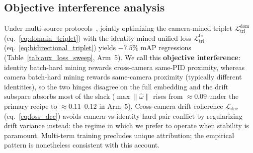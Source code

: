 \subsection{Objective interference analysis} \label{subsec:interference_analysis}
Under multi-source protocols~\cite{cho2024generalizable,zhao2021m3l}, jointly optimizing the camera-mined triplet $\mathcal{L}_{\mathrm{tri}}^{\mathrm{dom}}$ (eq.~\ref{eq:domain_triplet}) with the identity-mined unified loss $\mathcal{L}_{\mathrm{tri}}^{\mathrm{bi}}$ (eq.~\ref{eq:bidirectional_triplet}) yields $-7.5\%$ mAP regressions (Table~\ref{tab:aux_loss_sweep}, Arm~5). We call this \textbf{objective interference}: identity batch-hard mining rewards cross-camera same-PID proximity, whereas camera batch-hard mining rewards same-camera proximity (typically different identities), so the two hinges disagree on the full embedding and the drift subspace absorbs most of the slack ($\max\|\hat{\omega}\|$ rises from ${\approx}0.09$ under the primary recipe to ${\approx}0.11$--$0.12$ in Arm~5). Cross-camera drift coherence $\mathcal{L}_{\mathrm{dcc}}$ (eq.~\ref{eq:loss_dcc}) avoids camera-vs-identity hard-pair conflict by regularizing drift variance instead: the regime in which we prefer to operate when stability is paramount. Multi-term training precludes unique attribution; the empirical pattern is nonetheless consistent with this account.
